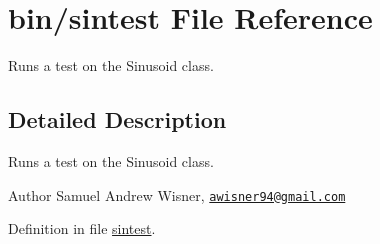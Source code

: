 \hypertarget{sintest}{\section{bin/sintest File Reference}
\label{sintest}
}


Runs a test on the Sinusoid class.  




\subsection{Detailed Description}
Runs a test on the Sinusoid class. 

\begin{DoxyAuthor}{Author}
Samuel Andrew Wisner, \href{mailto:awisner94@gmail.com}{\tt awisner94@gmail.\+com} 
\end{DoxyAuthor}


Definition in file \hyperlink{sintest_source}{sintest}.

